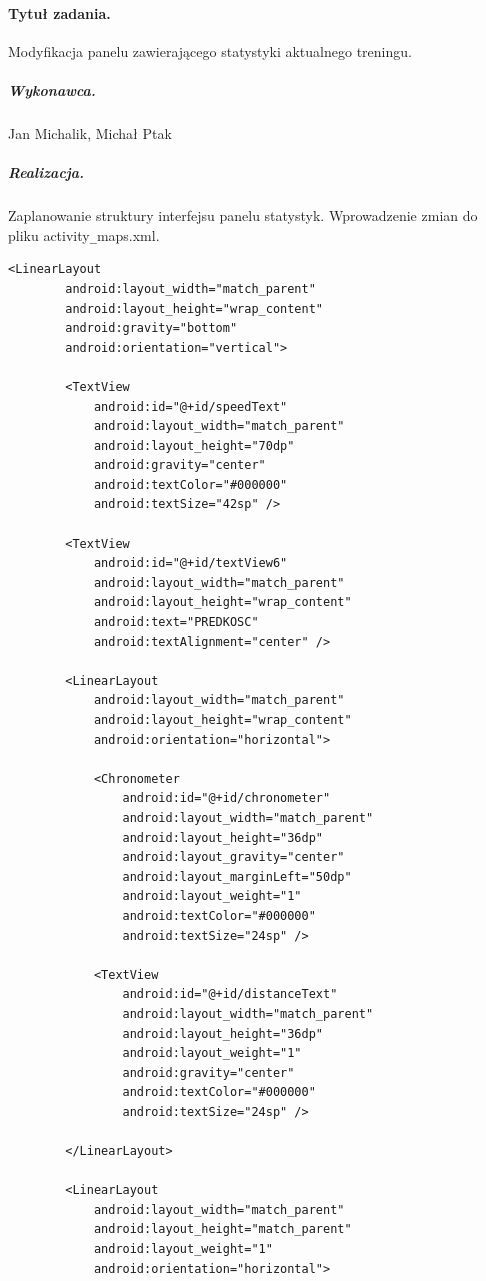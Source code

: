 \documentclass[a4paper]{article}
\begin{document}
\paragraph{Tytuł zadania.} Modyfikacja panelu zawierającego statystyki aktualnego treningu.
\subparagraph{Wykonawca.} Jan Michalik, Michał Ptak
\subparagraph{Realizacja.} Zaplanowanie struktury interfejsu panelu statystyk. Wprowadzenie zmian do pliku activity\verb|_|maps.xml.
\begin{lstlisting}[style=xml]
    <LinearLayout
        android:layout_width="match_parent"
        android:layout_height="wrap_content"
        android:gravity="bottom"
        android:orientation="vertical">

        <TextView
            android:id="@+id/speedText"
            android:layout_width="match_parent"
            android:layout_height="70dp"
            android:gravity="center"
            android:textColor="#000000"
            android:textSize="42sp" />

        <TextView
            android:id="@+id/textView6"
            android:layout_width="match_parent"
            android:layout_height="wrap_content"
            android:text="PREDKOSC"
            android:textAlignment="center" />

        <LinearLayout
            android:layout_width="match_parent"
            android:layout_height="wrap_content"
            android:orientation="horizontal">

            <Chronometer
                android:id="@+id/chronometer"
                android:layout_width="match_parent"
                android:layout_height="36dp"
                android:layout_gravity="center"
                android:layout_marginLeft="50dp"
                android:layout_weight="1"
                android:textColor="#000000"
                android:textSize="24sp" />

            <TextView
                android:id="@+id/distanceText"
                android:layout_width="match_parent"
                android:layout_height="36dp"
                android:layout_weight="1"
                android:gravity="center"
                android:textColor="#000000"
                android:textSize="24sp" />

        </LinearLayout>

        <LinearLayout
            android:layout_width="match_parent"
            android:layout_height="match_parent"
            android:layout_weight="1"
            android:orientation="horizontal">


\end{lstlisting}
\end{document}
